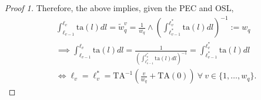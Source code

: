 \documentclass[hidelinks, nonatbib]{elsarticle}
\begin{document}
\begin{lemma}
\begin{proof}[Proof 1]
        Therefore, the above implies, given the PEC and OSL,
        \begin{align}
        &
        \int_{\ell_{v-1}}^{\ell_{v}}{
            \text{ta}(l)
            dl
        }
        =
        \tilde{w}_{q}^{v} =
        \frac{1}{w_q}
        \land
        \left(
            \int_{
                \ell_{v-1}^{*}
            }^{
                \ell_{v}^{*}    
            }{
                \text{ta}(l)
                dl
            }
        \right) ^ {-1}
        :=
        w_q
        \\
        &
        \implies
        \int_{\ell_{v-1}}^{\ell_{v}}{
            \text{ta}(l)
            dl
        }
        =
        \frac{1}{
            \left(
                \int_{
                    \ell_{v-1}^{*}
                }^{
                    \ell_{v}^{*}    
                }{
                    \text{ta}(l)
                    dl
                }
            \right) ^ {-1}
        }
        =
        \int_{
            \ell_{v-1}^{*}
        }^{
            \ell_{v}^{*}    
        }{
            \text{ta}(l)
            dl
        }
        \\
        &
        \iff
        \ell_{v}
        =
        \ell_{v}^{*}
        =
        \text{TA}^{-1}\left(
            \frac{v}{w_q}
            +
            \text{TA}(0)
        \right)
        \
        \forall
        \
        v \in \{1, \dots, w_q\}
        .
        \end{align}
    \end{proof}
    

\end{lemma}
\end{document}
